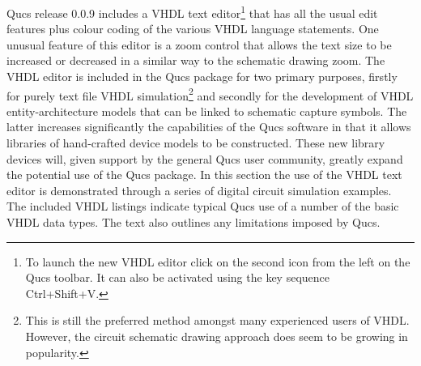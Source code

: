 Qucs release 0.0.9 includes a VHDL text editor\footnote{To launch the
new VHDL editor click on the second icon from the left on the Qucs
toolbar. It can also be activated using the key sequence
Ctrl+Shift+V.} that has all the usual edit features plus colour coding
of the various VHDL language statements.  One unusual feature of this
editor is a zoom control that allows the text size to be increased or
decreased in a similar way to the schematic drawing zoom.  The VHDL
editor is included in the Qucs package for two primary purposes,
firstly for purely text file VHDL simulation\footnote{This is still
the preferred method amongst many experienced users of VHDL.  However,
the circuit schematic drawing approach does seem to be growing in
popularity.  } and secondly for the development of VHDL
entity-architecture models that can be linked to schematic capture
symbols.  The latter increases significantly the capabilities of the
Qucs software in that it allows libraries of hand-crafted device
models to be constructed.  These new library devices will, given
support by the general Qucs user community, greatly expand the
potential use of the Qucs package.  In this section the use of the
VHDL text editor is demonstrated through a series of digital circuit
simulation examples. The included VHDL listings indicate typical Qucs
use of a number of the basic VHDL data types. The text also outlines
any limitations imposed by Qucs.
 
